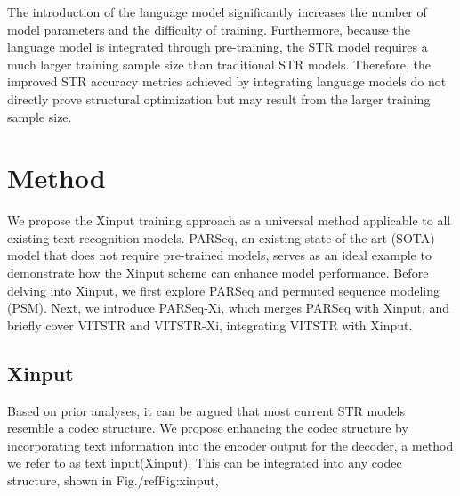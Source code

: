 \documentclass[runningheads]{llncs}
\begin{document}
The introduction of the language model significantly increases the number of model parameters and the difficulty of training.	Furthermore, because the language model is integrated through pre-training, the STR model requires a much larger training sample size than traditional STR models.	Therefore, the improved STR accuracy metrics achieved by integrating language models do not directly prove structural optimization but may result from the larger training sample size.	

\section{Method} \label{sec:method}
We propose the Xinput training approach as a universal method applicable to all existing text recognition models.	PARSeq, an existing state-of-the-art (SOTA) model that does not require pre-trained models, serves as an ideal example to demonstrate how the Xinput scheme can enhance model performance.	Before delving into Xinput, we first explore PARSeq and permuted sequence modeling (PSM).	Next, we introduce PARSeq-Xi, which merges PARSeq with Xinput, and briefly cover VITSTR and VITSTR-Xi, integrating VITSTR with Xinput.	

\subsection{Xinput} \label{subsec:xinput}
Based on prior analyses, it can be argued that most current STR models resemble a codec structure.	We propose enhancing the codec structure by incorporating text information into the encoder output for the decoder, a method we refer to as text input(Xinput). This can be integrated into any codec structure, shown in Fig./ref{Fig:xinput}, 
\end{document}

